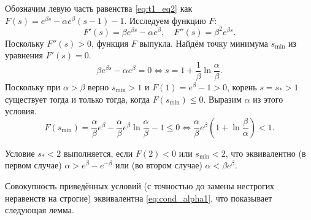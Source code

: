 Обозначим левую часть равенства \eqref{eq:t1_eq2} как $F(s) = e^{\beta s} - \alpha e^{\beta} (s - 1) - 1$. Исследуем функцию $F$:
%
\[
F'(s) = \beta e^{\beta s} - \alpha e^{\beta}, \quad F''(s) = \beta^2 e^{\beta s}.
\]
%
Поскольку $F''(s) > 0$, функция $F$ выпукла. Найдём точку минимума $s_{\min}$ из уравнения $F'(s) = 0$.
\[
\beta e^{\beta s} - \alpha e^{\beta} = 0 \Leftrightarrow s = 1 + \frac{1}{\beta}\ln\frac{\alpha}{\beta}.
\]
%
Поскольку при $\alpha > \beta$ верно $s_{\min} > 1$ и $F(1) = e^{\beta} - 1 > 0$, корень $s = s_* > 1$ существует тогда и только тогда, когда $F(s_{\min}) \leqslant 0$. Выразим $\alpha$ из этого условия.
%
\[
F(s_{\min}) = \frac{\alpha}{\beta}e^{\beta} - \frac{\alpha}{\beta}e^\beta\ln\frac{\alpha}{\beta} - 1 \leq 0 \Leftrightarrow \frac{\alpha}{\beta}e^{\beta}\left(1 + \ln\frac{\beta}{\alpha}\right) < 1.
\]


Условие $s_* < 2$ выполняется, если $F(2) < 0$ или $s_{\min} < 2$, что эквивалентно (в первом случае) $\alpha > e^{\beta} - e^{-\beta}$ или (во втором случае) $\alpha < \beta e^{\beta}$.

Совокупность приведённых условий (с точностью до замены нестрогих неравенств на строгие) эквивалентна \eqref{eq:cond_alpha1}, что показывает следующая лемма.

